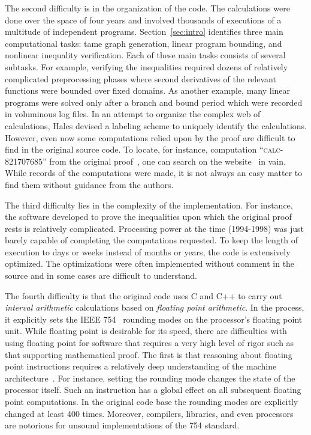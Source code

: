 \documentclass[11pt]{amsart}
\def\calc#1{{\textsc{calc-#1}}}
\begin{document}
The second difficulty is in the organization of the code. The
calculations were done over the space of four years and involved
thousands of executions of a multitude of independent programs. 
Section~\ref{sec:intro} identifies  three main computational
tasks: tame graph generation, linear program
bounding, and nonlinear inequality verification.  Each of these main
tasks consists of several subtasks.  For example, verifying the
inequalities required dozens of relatively complicated preprocessing
phases where second derivatives of the relevant functions were bounded
over fixed domains.  As another example, many linear programs were
solved only after a branch and bound period which were recorded in
voluminous log files.  In an attempt to organize the complex 
web of calculations, Hales
devised a labeling scheme to uniquely identify the calculations.
However, even now some computations relied upon by the proof are
difficult to find in the original source code.  To locate, for
instance, computation ``\calc{821707685}'' from the original
proof~\cite[p.159]{Hales:2006:DCG}, one can search on the
website~\cite{website:Hales:1998:Code} in vain.  While records of the
computations were made, it is not always an easy matter to find them
without guidance from the authors.

The third difficulty lies in the complexity of the implementation. For
instance, the software developed to prove the inequalities upon which
the original proof rests is relatively complicated. Processing power
at the time (1994-1998) was just barely capable of completing the
computations requested. To keep the length of execution to days or
weeks instead of months or years, the code is extensively
optimized. The optimizations were often implemented without comment in
the source and in some cases are difficult to understand.

The fourth difficulty is that
the original code uses C and C++ to carry out \emph{interval
arithmetic} calculations based on \emph{floating point arithmetic}. In
the process, it explicitly sets the IEEE 754~\cite{IEEE:1985:IEE754}
rounding modes on the processor's floating point unit.  While floating
point is desirable for its speed, there are difficulties with using
floating point for software that requires a very high level of rigor
such as that supporting mathematical proof.  The first is that
reasoning about floating point instructions requires a relatively deep
understanding of the machine architecture~\cite{Monniaux:2008:TOPLAS}.
For instance, setting the rounding mode changes the state of the
processor itself. Such an instruction has a global effect on all
subsequent floating point computations.  In the original code base the
rounding modes are explicitly changed at least 400 times.  Moreover,
compilers, libraries, and even processors are notorious for unsound
implementations of the 754 standard.  
\end{document}
